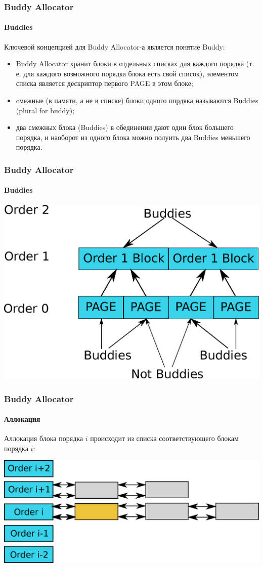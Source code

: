 \begin{frame}
\frametitle{Buddy Allocator}
\framesubtitle{Buddies}

Ключевой концепцией для Buddy Allocator-а является понятие Buddy:
\begin{itemize}
  \item Buddy Allocator хранит блоки в отдельных списках для каждого порядка (т. е. для каждого возможного порядка блока есть свой список), элементом списка является дескриптор первого PAGE в этом блоке;
  \item cмежные (в памяти, а не в списке) блоки одного пордяка называются Buddies (plural for buddy);
  \item два смежных блока (Buddies) в обединении дают один блок большего порядка, и наоборот из одного блока можно полуить два Buddies меньшего порядка.
\end{itemize}

\end{frame}

\begin{frame}
\frametitle{Buddy Allocator}
\framesubtitle{Buddies}

\includegraphics[width=.9\linewidth]{buddy-buddies}

\end{frame}

\begin{frame}
\frametitle{Buddy Allocator}
\framesubtitle{Аллокация}

Аллокация блока порядка $i$ происходит из списка соответствующего блокам порядка $i$:

\includegraphics[width=.9\linewidth]{buddy-alloc0}

\end{frame}

